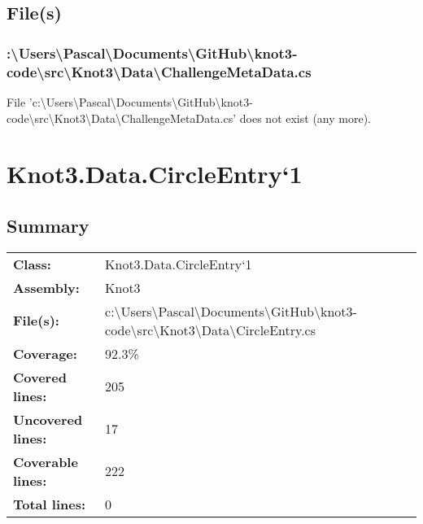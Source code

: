 \documentclass[a4paper,10pt]{article}
\begin{document}
\subsection{File(s)}
\subsubsection{:\textbackslash Users\textbackslash Pascal\textbackslash Documents\textbackslash GitHub\textbackslash knot3-code\textbackslash src\textbackslash Knot3\textbackslash Data\textbackslash ChallengeMetaData.cs}
 File 'c:\textbackslash Users\textbackslash Pascal\textbackslash Documents\textbackslash GitHub\textbackslash knot3-code\textbackslash src\textbackslash Knot3\textbackslash Data\textbackslash ChallengeMetaData.cs' does not exist (any more).
\newpage
\section{Knot3.Data.CircleEntry`1}
\subsection{Summary}
\begin{longtable}[l]{ll}
\textbf{Class:} & Knot3.Data.CircleEntry`1\\
\textbf{Assembly:} & Knot3\\
\textbf{File(s):} & \begin{minipage}[t]{12cm}{c:\textbackslash Users\textbackslash Pascal\textbackslash Documents\textbackslash GitHub\textbackslash knot3-code\textbackslash src\textbackslash Knot3\textbackslash Data\textbackslash CircleEntry.cs}\end{minipage} \\
\textbf{Coverage:} & 92.3\%\\
\textbf{Covered lines:} & 205\\
\textbf{Uncovered lines:} & 17\\
\textbf{Coverable lines:} & 222\\
\textbf{Total lines:} & 0\\
\end{longtable}
\end{document}
